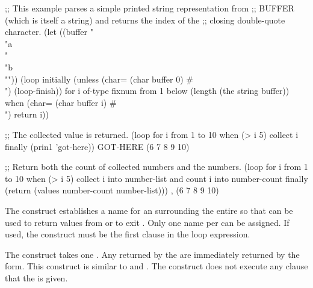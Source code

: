 \code
;; This example parses a simple printed string representation from 
;; BUFFER (which is itself a string) and returns the index of the
;; closing double-quote character.
 (let ((buffer "\\"a\\" \\"b\\""))
   (loop initially (unless (char= (char buffer 0) #\\")
                     (loop-finish))
         for i of-type fixnum from 1 below (length (the string buffer))
         when (char= (char buffer i) #\\")
          return i))
 
;; The collected value is returned.
 (loop for i from 1 to 10
       when (> i 5)
         collect i
       finally (prin1 'got-here))
\OUT GOT-HERE
\EV (6 7 8 9 10) 

;; Return both the count of collected numbers and the numbers.
 (loop for i from 1 to 10
       when (> i 5)
         collect i into number-list
         and count i into number-count
       finally (return (values number-count number-list)))
, (6 7 8 9 10)
\endcode
 
\endsubsubsection%

\endsubsection%

                                          

The  construct
establishes a name for an  surrounding the 
entire
 so that  can be used to return 
values from or to exit .   
Only one name per   can be assigned.
If used, the  construct must be the first clause in the loop expression.

 The  construct takes one . 
 Any  returned by the  
 are immediately returned by the  form.
This construct is similar to  and .
The  construct 
does not execute any  clause that 
the  
is given.
                
